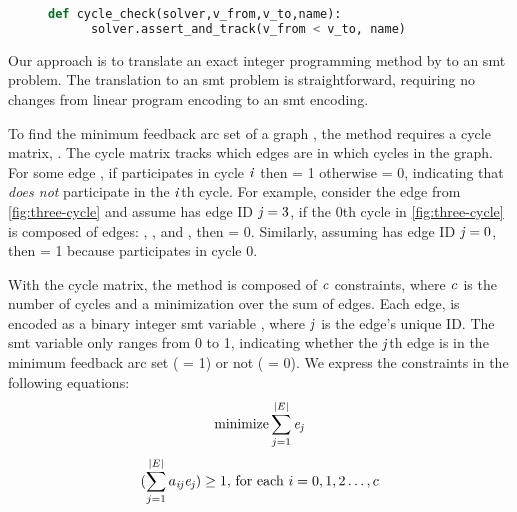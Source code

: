 \label{section:gadgets}
%
\begin{figure}[h]
  \centering
  \begin{lstlisting}[language=python,caption={Cycle check gadget. \texttt{v\_from}
  and \texttt{v\_to} are symbolic variables in the solver. \texttt{name} is the constraint
  label in the solver. The cycle check replaces each edge with the constraint
  that previous vertices must be a lesser integer value than future vertices}]
  def cycle_check(solver,v_from,v_to,name):
      solver.assert_and_track(v_from < v_to, name)
  \end{lstlisting}
\end{figure}

Our approach is to translate an exact integer programming method by
\citet{alietall} to an \ac{smt} problem. The translation to an \ac{smt} problem
is straightforward, requiring no changes from linear program encoding to an
\ac{smt} encoding.

To find the minimum feedback arc set of a graph , the method requires a
cycle matrix, . The cycle matrix tracks which edges are in which
cycles in the graph. For some edge , if  participates in
cycle $\mathit{i}$ then  = 1 otherwise  = 0, indicating
that  \emph{does not} participate in the $\mathit{i}$th cycle. For
example, consider the edge  from \autoref{fig:three-cycle} and assume
 has edge ID $\mathit{j} = 3$, if the 0th cycle in
\autoref{fig:three-cycle} is composed of edges: , , and
, then  = 0. Similarly, assuming  has edge
ID $\mathit{j} = 0$, then  = 1 because  participates in
cycle 0.

With the cycle matrix, the method is composed of $\mathit{c}$ constraints, where
$\mathit{c}$ is the number of cycles and a minimization over the sum of edges. Each
edge,  is encoded as a binary integer \ac{smt} variable ,
where $\mathit{j}$ is the edge's unique ID. The \ac{smt} variable  only
ranges from 0 to 1, indicating whether the $\mathit{j}$th edge is in the minimum
feedback arc set ( = 1) or not ( = 0). We express the
constraints in the following equations:
%
\begin{equation}
  \label{one}
 \operatorname*{minimize} \sum_{j=1}^{|E|} \mathit{e_{j}}
\end{equation}
%
\begin{equation}
  \label{two}
  (\sum_{j=1}^{|E|} a_{\mathit{ij}} \mathit{e_{j}}) \ge 1, \, \text{for each } i = 0, 1, 2 \dots{}, c
\end{equation}

